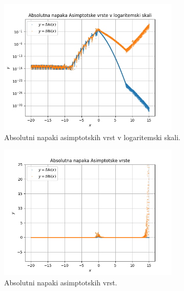 \documentclass[a4paper, 12pt, slovene]{article}
\begin{document}
\begin{figure}[H]
\begin{subfigure}{0.49\textwidth}
	\centering
	\includegraphics[width=0.95\textwidth]{grafi/asimptotska_abs_err.png}
	\caption{Absolutni napaki asimptotskih vrst v logaritemski skali.}
	\label{fig-asi-abserr-log}
\end{subfigure}
\begin{subfigure}{0.49\textwidth}
	\centering
	\includegraphics[width=0.95\textwidth]{grafi/asimptotska_abs_err_noscale.png}
	\caption{Absolutni napaki asimptotskih vrst.}
	\label{fig-asi-abserr}
\end{subfigure}
\begin{subfigure}{0.49\textwidth}
	\centering

\end{subfigure}
\end{figure}
\end{document}
